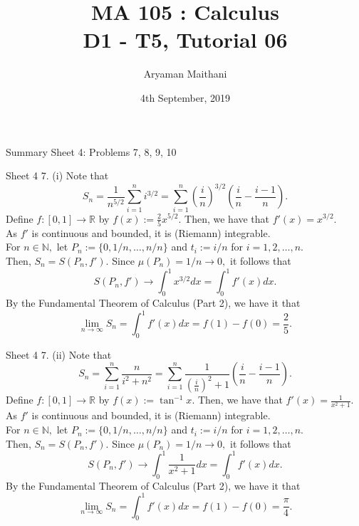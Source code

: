\documentclass[handout, aspectratio=169]{beamer}
\title{MA 105 : Calculus\\ D1 - T5, Tutorial 06}  %
\author{Aryaman Maithani}
\date[4-09-2019]{4th September, 2019}               %
\institute[IITB]{IIT Bombay}
\begin{document}
\begin{frame}
	\titlepage
\end{frame}
\begin{frame}{Summary} 
	Sheet 4: Problems 7, 8, 9, 10
\end{frame}
\begin{frame}{Sheet 4}                            %
	7. (i) Note that \\
	\[S_n = \dfrac{1}{n^{5/2}}\displaystyle\sum_{i=1}^{n}i^{3/2} = \sum_{i=1}^{n}\left(\dfrac{i}{n}\right)^{3/2}\left(\dfrac{i}{n} - \dfrac{i-1}{n}\right).\]
	Define $f:[0, 1] \to \mathbb{R}$ by $f(x) := \frac{2}{5}x^{5/2}.$ Then, we have that $f'(x) = x^{3/2}.$\\
	As $f'$ is continuous and bounded, it is (Riemann) integrable. \\
	For $n \in \mathbb{N},$ let $P_n := \{0, 1/n, \ldots, n/n\}$ and $t_i := i/n$ for $i = 1, 2, \ldots, n.$\\
	Then, $S_n = S(P_n, f').$ Since $\mu(P_n) = 1/n \to 0,$ it follows that
	\[S(P_n, f') \to \int_{0}^{1} x^{3/2} dx = \int_{0}^{1} f'(x) dx. \]
	By the Fundamental Theorem of Calculus (Part 2), we have it that
	\[\lim_{n\to \infty}S_n = \int_{0}^{1} f'(x) dx = f(1) - f(0) = \dfrac{2}{5}.\]
\end{frame}
\begin{frame}{Sheet 4}
	7. (ii) Note that \\
	\[S_n = \sum_{i=1}^{n}\dfrac{n}{i^2 + n^2} = \sum_{i=1}^{n}\dfrac{1}{\left(\frac{i}{n}\right)^2 + 1}\left(\frac{i}{n} - \frac{i-1}{n}\right) .\]
	Define $f:[0, 1] \to \mathbb{R}$ by $f(x) := \tan^{-1}x.$ Then, we have that $f'(x) = \frac{1}{x^2 + 1}.$\\
	As $f'$ is continuous and bounded, it is (Riemann) integrable. \\
	For $n \in \mathbb{N},$ let $P_n := \{0, 1/n, \ldots, n/n\}$ and $t_i := i/n$ for $i = 1, 2, \ldots, n.$\\
	Then, $S_n = S(P_n, f').$ Since $\mu(P_n) = 1/n \to 0,$ it follows that
	\[S(P_n, f') \to \int_{0}^{1} \dfrac{1}{x^2 + 1} dx = \int_{0}^{1} f'(x) dx. \]
	By the Fundamental Theorem of Calculus (Part 2), we have it that
	\[\lim_{n\to \infty}S_n = \int_{0}^{1} f'(x) dx = f(1) - f(0) = \dfrac{\pi}{4}.\]
\end{frame}
\end{document}
